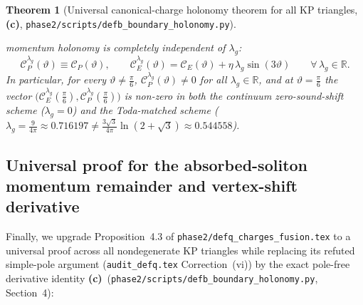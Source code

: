 \documentclass[11pt,a4paper]{article}
\newtheorem{theorem}{Theorem}[section]
\theoremstyle{remark}
\newcommand{\Lc}{\textbf{(c)}}
\newcommand{\shol}{\texttt{phase2/\allowbreak scripts/\allowbreak defb\_\allowbreak boundary\_\allowbreak holonomy.py}}
\begin{document}
\begin{theorem}[Universal canonical-charge holonomy theorem for all KP triangles, \Lc, \shol]
\begin{enumerate}
momentum holonomy is completely independent of $\lambda_g$:
\begin{equation}\label{eq:CP_CE_lamg}
  \mathcal{C}_P^{\lambda_g}(\vartheta) \equiv \mathcal{C}_P(\vartheta), \qquad
  \mathcal{C}_E^{\lambda_g}(\vartheta) = \mathcal{C}_E(\vartheta) + \eta\,\lambda_g\sin(3\vartheta) \qquad
  \forall\,\lambda_g \in \mathbb{R}.
\end{equation}
In particular, for every $\vartheta \ne \frac{\pi}{6}$,
$\mathcal{C}_P^{\lambda_g}(\vartheta) \ne 0$ for all $\lambda_g \in \mathbb{R}$,
and at $\vartheta = \frac{\pi}{6}$ the vector
$\big(\mathcal{C}_E^{\lambda_g}(\frac{\pi}{6}),\mathcal{C}_P^{\lambda_g}(\frac{\pi}{6})\big)$
is non-zero in both the continuum zero-sound-shift scheme ($\lambda_g=0$) and
the Toda-matched scheme ($\lambda_g = \frac{9}{4\pi} \approx 0.716197 \ne \frac{3\sqrt{3}}{4\pi}\ln(2+\sqrt{3}) \approx 0.544558$).
\end{enumerate}
\end{theorem}

\subsection{Universal proof for the absorbed-soliton momentum remainder and vertex-shift derivative}

Finally, we upgrade Proposition~4.3 of \texttt{phase2/defq\_charges\_fusion.tex}
to a universal proof across all nondegenerate KP triangles while replacing its
refuted simple-pole argument (\texttt{audit\_defq.tex} Correction~(vi)) by the
exact pole-free derivative identity \Lc\ (\shol, Section~4):
\end{document}
